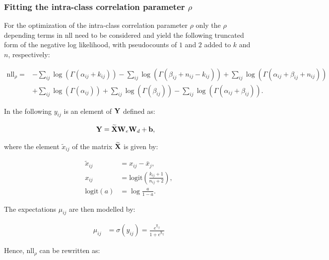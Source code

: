 \subsubsection*{Fitting the intra-class correlation parameter $\rho$}

For the optimization of the intra-class correlation parameter $\rho$ only the 
$\rho$ depending terms in $\text{nll}$ need to be considered and yield the 
following truncated form of the negative log likelihood, with pseudocounts of $1$
and $2$ added to $k$ and $n$, respectively:

\begin{align*}
\text{nll}_{\rho} =& 
     - \sum_{ij}\log(\Gamma(\alpha_{ij}+k_{ij})) %
     - \sum_{ij}\log(\Gamma(\beta_{ij}+n_{ij}-k_{ij})) %
     + \sum_{ij}\log(\Gamma(\alpha_{ij} + \beta_{ij} + n_{ij})) \\ %
    &+ \sum_{ij}\log(\Gamma(\alpha_{ij})) %
     + \sum_{ij}\log(\Gamma(\beta_{ij})) %
     - \sum_{ij}\log(\Gamma(\alpha_{ij} + \beta_{ij})). %
\end{align*}

In the following $y_{ij}$ is an element of $\mathbf{Y}$ defined as:

\begin{align}\label{eq:Y}
\mathbf{Y} &= \mathbf{\widetilde{X}} \mathbf{W}_e \mathbf{W}_d + \mathbf{b},
\end{align}

where the element $\widetilde{x}_{ij}$ of the matrix $\mathbf{\widetilde{X}}$ is given by: 

\begin{align*}
\widetilde{x}_{ij} &= x_{ij} - \bar{x}_j, \\
x_{ij} &= \text{logit} \left (\frac{k_{ij}+1}{n_{ij}+2} \right), \\
\text{logit}(a) &= \log \frac{a}{1-a}.
\end{align*}

The expectations $\mu_{ij}$ are then modelled by:

\begin{align*}
\mu_{ij} &= \sigma \left (y_{ij} \right) = \frac{e^{y_{ij}}}{1 + e^{y_{ij}}}
\end{align*}


Hence, $\text{nll}_{\rho}$ can be rewritten as:

